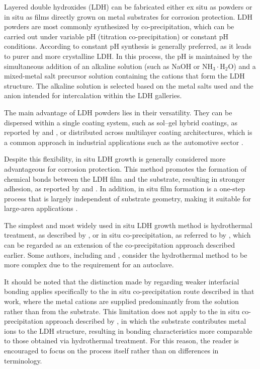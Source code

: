 \documentclass[11pt,twoside,a4paper]{report}
\begin{document}
Layered double hydroxides (LDH) can be fabricated either ex situ as powders or in situ as films directly grown on metal substrates for corrosion protection. LDH powders are most commonly synthesized by co-precipitation, which can be carried out under variable pH (titration co-precipitation) or constant pH conditions. According to \citet{BoualiReview2020} constant pH synthesis is generally preferred, as it leads to purer and more crystalline LDH. In this process, the pH is maintained by the simultaneous addition of an alkaline solution (such as NaOH or NH$_{3}\cdot$H$_{2}$O) and a mixed-metal salt precursor solution containing the cations that form the LDH structure. The alkaline solution is selected based on the metal salts used and the anion intended for intercalation within the LDH galleries. 

The main advantage of LDH powders lies in their versatility. They can be dispersed within a single coating system, such as sol--gel hybrid coatings, as reported by \citet{Yasakau2014} and \citet{Alvarez2010}, or distributed across multilayer coating architectures, which is a common approach in industrial applications such as the automotive sector \cite{BoualiReview2020}.

Despite this flexibility, in situ LDH growth is generally considered more advantageous for corrosion protection. This method promotes the formation of chemical bonds between the LDH film and the substrate, resulting in stronger adhesion, as reported by \citet{BoualiReview2020,Cao2022} and \citet{Guo2009}. In addition, in situ film formation is a one-step process that is largely independent of substrate geometry, making it suitable for large-area applications \cite{Guo2009,BoualiReview2020}.

The simplest and most widely used in situ LDH growth method is hydrothermal treatment, as described by \citet{Guo2009}, or in situ co-precipitation, as referred to by \citet{BoualiReview2020}, which can be regarded as an extension of the co-precipitation approach described earlier. Some authors, including \citet{Cao2022} and \citet{Zhou2017}, consider the hydrothermal method to be more complex due to the requirement for an autoclave.

It should be noted that the distinction made by \citet{Cao2022} regarding weaker interfacial bonding applies specifically to the in situ co-precipitation route described in that work, where the metal cations are supplied predominantly from the solution rather than from the substrate. This limitation does not apply to the in situ co-precipitation approach described by \citet{BoualiReview2020}, in which the substrate contributes metal ions to the LDH structure, resulting in bonding characteristics more comparable to those obtained via hydrothermal treatment. For this reason, the reader is encouraged to focus on the process itself rather than on differences in terminology. 
\end{document}
